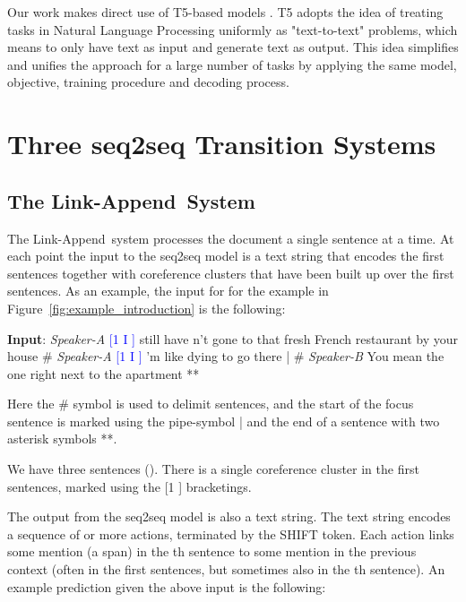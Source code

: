 \documentclass[11pt,a4paper]{article}
\newcommand{\LA}{Link-Append}
\begin{document}
Our work makes direct use of T5-based models  \cite{DBLP:journals/corr/abs-1910-10683}.
{\sc T5} adopts the idea of treating tasks in Natural Language Processing uniformly as "text-to-text" problems, which means to only have text as input and generate text as output. This idea simplifies and unifies the approach for a large number of tasks by applying the same model, objective, training procedure and decoding process.



\section{Three seq2seq Transition Systems}
\label{sec:systems}


\newcommand{\mi}{{\cal M}_i}
\newcommand{\mm}{{\cal M}}
\newcommand{\mli}{{\cal M}_{\leq i}}

\subsection{The \LA~System}

The \LA~system processes the document a single sentence at a time. At each point the input to the seq2seq model is a text string that encodes the first  sentences together with coreference clusters that have been built up over the first  sentences. As an example, the input for  for the example in Figure~\ref{fig:example_introduction} is the following:

\vspace{2ex}
\noindent
{\bf Input}:
{\it Speaker-A} \textcolor{blue}{[1 I ]} still have n't gone to that fresh French restaurant by your house \# {\it Speaker-A} \textcolor{blue}{[1 I ]} 'm like dying to go there | \# {\it Speaker-B} You mean the one right next to the apartment **


\vspace{2ex}

Here the \# symbol is used to delimit sentences, and the start of the focus sentence is marked using the pipe-symbol | and the end of a sentence with two asterisk symbols **. 


We have three sentences (). There is a single coreference cluster in the first  sentences, marked using the [1 ] bracketings. 

The output from the seq2seq model is also a text string. The text string encodes a sequence of  or more actions, terminated by the SHIFT token. Each action links some mention (a span) in the th sentence to some mention in the previous context (often in the first  sentences, but sometimes also in the th sentence). An example prediction given the above input is the following:
\end{document}
